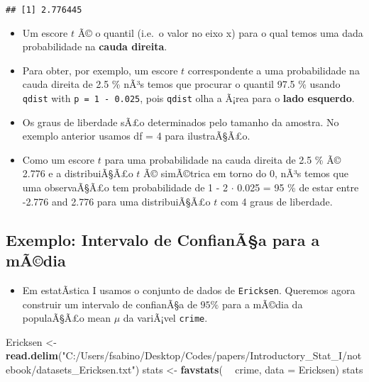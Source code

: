 \documentclass[]{article}
\newenvironment{Shaded}{\begin{snugshade}}{\end{snugshade}}
\newcommand{\KeywordTok}[1]{\textcolor[rgb]{0.13,0.29,0.53}{\textbf{#1}}}
\newcommand{\DataTypeTok}[1]{\textcolor[rgb]{0.13,0.29,0.53}{#1}}
\newcommand{\StringTok}[1]{\textcolor[rgb]{0.31,0.60,0.02}{#1}}
\newcommand{\OperatorTok}[1]{\textcolor[rgb]{0.81,0.36,0.00}{\textbf{#1}}}
\newcommand{\NormalTok}[1]{#1}
\providecommand{\tightlist}{%
  \setlength{\itemsep}{0pt}\setlength{\parskip}{0pt}}
\begin{document}
\begin{verbatim}
## [1] 2.776445
\end{verbatim}

\begin{itemize}
\tightlist
\item
  Um escore \(t\) Ã© o quantil (i.e.~o valor no eixo x) para o qual
  temos uma dada probabilidade na \textbf{cauda direita}.
\item
  Para obter, por exemplo, um escore \(t\) correspondente a uma
  probabilidade na cauda direita de 2.5 \% nÃ³s temos que procurar o
  quantil 97.5 \% usando \texttt{qdist} with \texttt{p\ =\ 1\ -\ 0.025},
  pois \texttt{qdist} olha a Ã¡rea para o \textbf{lado esquerdo}.
\item
  Os graus de liberdade sÃ£o determinados pelo tamanho da amostra. No
  exemplo anterior usamos df = 4 para ilustraÃ§Ã£o.
\item
  Como um escore \(t\) para uma probabilidade na cauda direita de 2.5 \%
  Ã© 2.776 e a distribuiÃ§Ã£o \(t\) Ã© simÃ©trica em torno do 0, nÃ³s
  temos que uma observaÃ§Ã£o tem probabilidade de 1 - 2 \(\cdot\) 0.025
  = 95 \% de estar entre -2.776 and 2.776 para uma distribuiÃ§Ã£o \(t\)
  com 4 graus de liberdade.
\end{itemize}

\subsection{Exemplo: Intervalo de ConfianÃ§a para a
mÃ©dia}\label{exemplo-intervalo-de-confianaa-para-a-madia}

\begin{itemize}
\tightlist
\item
  Em estatÃ­stica I usamos o conjunto de dados de \texttt{Ericksen}.
  Queremos agora construir um intervalo de confianÃ§a de \(95\%\) para a
  mÃ©dia da populaÃ§Ã£o mean \(\mu\) da variÃ¡vel \texttt{crime}.
\end{itemize}

\begin{Shaded}
\begin{Highlighting}[]
\NormalTok{Ericksen <-}\StringTok{ }\KeywordTok{read.delim}\NormalTok{(}\StringTok{"C:/Users/fsabino/Desktop/Codes/papers/Introductory_Stat_I/notebook/datasets_Ericksen.txt"}\NormalTok{)}
\NormalTok{stats <-}\StringTok{ }\KeywordTok{favstats}\NormalTok{( }\OperatorTok{~}\StringTok{ }\NormalTok{crime, }\DataTypeTok{data =}\NormalTok{ Ericksen)}
\NormalTok{stats}
\end{Highlighting}
\end{Shaded}
\end{document}
